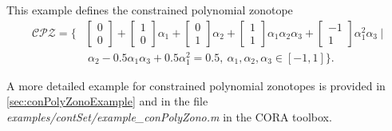 \begin{center}
\begin{minipage}[t]{0.55\textwidth}
	\vspace{10pt}
	\footnotesize
	
\end{minipage}
\begin{minipage}[t]{0.3\textwidth}
	\vspace{0pt}
	\centering
\end{minipage}
\end{center}

This example defines the constrained polynomial zonotope
\begin{equation*}
\begin{split}
		\mathcal{CPZ} = \bigg \{ & \begin{bmatrix} 0 \\ 0 \end{bmatrix} + \begin{bmatrix} 1 \\ 0 \end{bmatrix} \alpha_1 + \begin{bmatrix} 0 \\ 1 \end{bmatrix} \alpha_2 + \begin{bmatrix} 1 \\ 1 \end{bmatrix} \alpha_1 \alpha_2 \alpha_3 + \begin{bmatrix} -1 \\ 1 \end{bmatrix} \alpha_1^2 \alpha_3 ~ \bigg |  \\
		& ~ \alpha_2 - 0.5 \alpha_1 \alpha_3 + 0.5 \alpha_1^2 = 0.5, ~ \alpha_1,\alpha_2,\alpha_3 \in [-1,1] \bigg \}.
	\end{split}
\end{equation*}

A more detailed example for constrained polynomial zonotopes is provided in \cref{sec:conPolyZonoExample} and in the file \textit{examples/contSet/example\_conPolyZono.m} in the CORA toolbox.